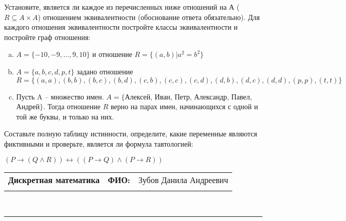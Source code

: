 \documentclass[10pt]{exam}
\newcommand{\class}{Дискретная математика}
\newcommand{\examdate}{}
\begin{document}
\begin{questions}
\question
Установите, является ли каждое из перечисленных ниже отношений на А ($R \subseteq A \times A$) отношением эквивалентности (обоснование ответа обязательно). Для каждого отношения эквивалентности постройте классы 
эквивалентности и постройте граф отношения:
\begin{enumerate} [a)]\setcounter{enumi}{0}
\item $A = \{-10, -9, … , 9, 10\}$ и отношение $R = \{(a,b)|a^{2} = b^{2}\}$
\item $A = \{a, b, c, d, p, t\}$ задано отношение $R = \{(a, a), (b, b), (b, c), (b, d), (c, b), (c, c), (c, d), (d, b), (d, c), (d, d), (p,p), (t,t)\}$
\item Пусть A – множество имен. $A = \{ $Алексей, Иван, Петр, Александр, Павел, Андрей$ \}$. Тогда отношение $R$ верно на парах имен, начинающихся с одной и той же буквы, и только на них.
\end{enumerate}\question Составьте полную таблицу истинности, определите, какие переменные являются фиктивными и проверьте, является ли формула тавтологией:

$(P \rightarrow (Q \land R)) \leftrightarrow ((P \rightarrow Q) \land (P \rightarrow R))$

\end{questions}
\newpage
\begin{flushright}
\begin{tabular}{p{2.8in} r l}
\textbf{\class} & \textbf{ФИО:} &Зубов Данила Андреевич
\\

\textbf{\examdate} &&\\
\end{tabular}\\
\end{flushright}
\rule[1ex]{\textwidth}{.1pt}
\end{document}
